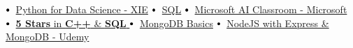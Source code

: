 \documentclass[letterpaper,11pt]{article}
\newcommand\sbullet[1][.5]{\mathbin{\vcenter{\hbox{\scalebox{#1}{$\bullet$}}}}}
\begin{document}
$\sbullet[.75] \hspace{0.2cm}${\href{certificateLink.com}{Python for Data Science - XIE}} \hspace{1cm}
$\sbullet[.75] \hspace{0.1cm}$ {\href{certificateLink.com}{SQL}} \hspace{2.6cm}
$\sbullet[.75] \hspace{0.2cm}${\href{certificateLink.com}{Microsoft AI Classroom - Microsoft}} \\


$\sbullet[.75] \hspace{0.2cm}${\href{certificateLink.com}{\textbf{5 Stars} in \textbf{C++} \& \textbf{SQL} \href{certificateLink.com}{\raisebox{-0.1\height}\faExternalLink }}}\hspace{1.45cm}
$\sbullet[.75] \hspace{0.2cm}${\href{certificateLink.com}{MongoDB Basics}} \hspace{0.5cm}
$\sbullet[.75] \hspace{0.2cm}${\href{certificateLink.com}{NodeJS with Express \& MongoDB - Udemy}} \\
\end{document}
